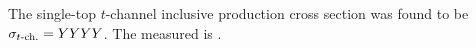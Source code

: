 The single-top $t$-channel inclusive production cross section was found to be $\sigma_{t\textrm{-ch.}} =YYYY$. The measured \vtb is \vtbRes.
